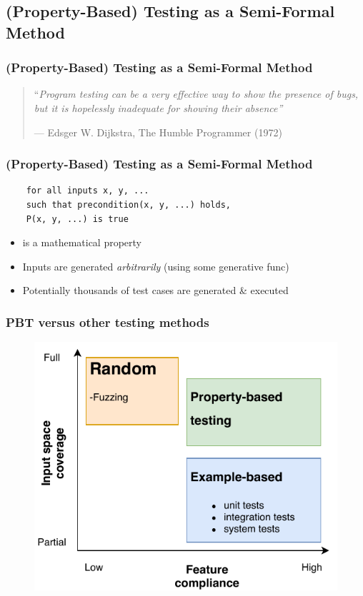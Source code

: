 \subsection{(Property-Based) Testing as a Semi-Formal Method}

\begin{frame}
\frametitle{(Property-Based) Testing as a Semi-Formal Method}

\begin{quote}
    ``\textit{Program testing can be a very effective way to show the presence of bugs, but it is hopelessly inadequate for
    showing their absence''}\cite{humbleprogrammer1972}
    \begin{flushright}
    --- Edsger W. Dijkstra, The Humble Programmer (1972)
    \end{flushright}
\end{quote}

\end{frame}

\begin{frame}[fragile]
\frametitle{(Property-Based) Testing as a Semi-Formal Method}
\begin{verbatim}
    for all inputs x, y, ...
    such that precondition(x, y, ...) holds,
    P(x, y, ...) is true
\end{verbatim}
\begin{itemize}
    \item {} is a mathematical property
    \item Inputs  are generated \textit{arbitrarily} (using some generative func)
    \item Potentially thousands of test cases are generated \& executed
\end{itemize}


\end{frame}

\begin{frame}
\frametitle{PBT versus other testing methods}
\begin{figure}
\includegraphics[scale=0.7]{media/Testing-diagram.pdf}
\end{figure}
\end{frame}

